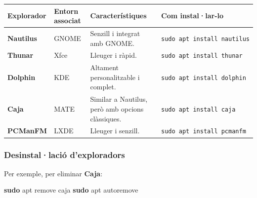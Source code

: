 \documentclass[
  catalan,
  a4paper,
]{article}
\newenvironment{Shaded}{\begin{snugshade}}{\end{snugshade}}
\newcommand{\FunctionTok}[1]{\textcolor[rgb]{0.13,0.29,0.53}{\textbf{#1}}}
\newcommand{\NormalTok}[1]{#1}
\begin{document}
\begin{longtable}[]{@{}
  >{\raggedright\arraybackslash}p{}
  >{\raggedright\arraybackslash}p{}
  >{\raggedright\arraybackslash}p{}
  >{\raggedright\arraybackslash}p{}@{}}
\toprule\noalign{}
\begin{minipage}[b]{\linewidth}\raggedright
\textbf{Explorador}
\end{minipage} & \begin{minipage}[b]{\linewidth}\raggedright
\textbf{Entorn associat}
\end{minipage} & \begin{minipage}[b]{\linewidth}\raggedright
\textbf{Característiques}
\end{minipage} & \begin{minipage}[b]{\linewidth}\raggedright
\textbf{Com instal·lar-lo}
\end{minipage} \\
\midrule\noalign{}
\endhead
\bottomrule\noalign{}
\endlastfoot
\textbf{Nautilus} & GNOME & Senzill i integrat amb GNOME. &
\texttt{sudo\ apt\ install\ nautilus} \\
\textbf{Thunar} & Xfce & Lleuger i ràpid. &
\texttt{sudo\ apt\ install\ thunar} \\
\textbf{Dolphin} & KDE & Altament personalitzable i complet. &
\texttt{sudo\ apt\ install\ dolphin} \\
\textbf{Caja} & MATE & Similar a Nautilus, però amb opcions clàssiques.
& \texttt{sudo\ apt\ install\ caja} \\
\textbf{PCManFM} & LXDE & Lleuger i senzill. &
\texttt{sudo\ apt\ install\ pcmanfm} \\
\end{longtable}

\subsubsection{Desinstal·lació
d'exploradors}\label{desinstallaciuxf3-dexploradors}

Per exemple, per eliminar \textbf{Caja}:

\begin{Shaded}
\begin{Highlighting}[]
\FunctionTok{sudo}\NormalTok{ apt remove caja}
\FunctionTok{sudo}\NormalTok{ apt autoremove}
\end{Highlighting}
\end{Shaded}
\end{document}
